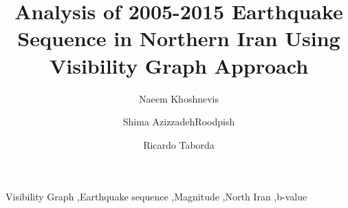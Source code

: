 \documentclass[a4paper,review]{elsarticle}
\begin{document}
\begin{frontmatter}

\title{Analysis of 2005-2015 Earthquake Sequence in Northern Iran Using Visibility Graph Approach}

\author[label1]{Naeem Khoshnevis}
\author[label1,label2]{Shima AzizzadehRoodpish}
\author[label1,label2]{Ricardo Taborda}

\address[label1]{Center for Earthquake Research and Information, University of Memphis, 3890 Central Ave., Memphis TN 38152, USA}
\address[label2]{Department of Civil Engineering, University of Memphis, 3890 Central Ave., Memphis TN 38152, USA}



\begin{keyword}
Visibility Graph \sep Earthquake sequence \sep Magnitude \sep North Iran \sep b-value 



\end{keyword}

\end{frontmatter}
















\end{document}
